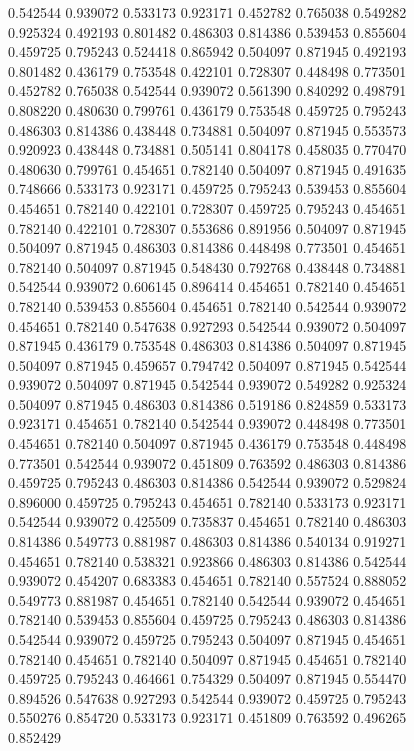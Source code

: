 \begin{figure}
\begin{center}
{  0.542544 0.939072
  0.533173 0.923171
  0.452782 0.765038
  0.549282 0.925324
  0.492193 0.801482
  0.486303 0.814386
  0.539453 0.855604
  0.459725 0.795243
  0.524418 0.865942
  0.504097 0.871945
  0.492193 0.801482
  0.436179 0.753548
  0.422101 0.728307
  0.448498 0.773501
  0.452782 0.765038
  0.542544 0.939072
  0.561390 0.840292
  0.498791 0.808220
  0.480630 0.799761
  0.436179 0.753548
  0.459725 0.795243
  0.486303 0.814386
  0.438448 0.734881
  0.504097 0.871945
  0.553573 0.920923
  0.438448 0.734881
  0.505141 0.804178
  0.458035 0.770470
  0.480630 0.799761
  0.454651 0.782140
  0.504097 0.871945
  0.491635 0.748666
  0.533173 0.923171
  0.459725 0.795243
  0.539453 0.855604
  0.454651 0.782140
  0.422101 0.728307
  0.459725 0.795243
  0.454651 0.782140
  0.422101 0.728307
  0.553686 0.891956
  0.504097 0.871945
  0.504097 0.871945
  0.486303 0.814386
  0.448498 0.773501
  0.454651 0.782140
  0.504097 0.871945
  0.548430 0.792768
  0.438448 0.734881
  0.542544 0.939072
  0.606145 0.896414
  0.454651 0.782140
  0.454651 0.782140
  0.539453 0.855604
  0.454651 0.782140
  0.542544 0.939072
  0.454651 0.782140
  0.547638 0.927293
  0.542544 0.939072
  0.504097 0.871945
  0.436179 0.753548
  0.486303 0.814386
  0.504097 0.871945
  0.504097 0.871945
  0.459657 0.794742
  0.504097 0.871945
  0.542544 0.939072
  0.504097 0.871945
  0.542544 0.939072
  0.549282 0.925324
  0.504097 0.871945
  0.486303 0.814386
  0.519186 0.824859
  0.533173 0.923171
  0.454651 0.782140
  0.542544 0.939072
  0.448498 0.773501
  0.454651 0.782140
  0.504097 0.871945
  0.436179 0.753548
  0.448498 0.773501
  0.542544 0.939072
  0.451809 0.763592
  0.486303 0.814386
  0.459725 0.795243
  0.486303 0.814386
  0.542544 0.939072
  0.529824 0.896000
  0.459725 0.795243
  0.454651 0.782140
  0.533173 0.923171
  0.542544 0.939072
  0.425509 0.735837
  0.454651 0.782140
  0.486303 0.814386
  0.549773 0.881987
  0.486303 0.814386
  0.540134 0.919271
  0.454651 0.782140
  0.538321 0.923866
  0.486303 0.814386
  0.542544 0.939072
  0.454207 0.683383
  0.454651 0.782140
  0.557524 0.888052
  0.549773 0.881987
  0.454651 0.782140
  0.542544 0.939072
  0.454651 0.782140
  0.539453 0.855604
  0.459725 0.795243
  0.486303 0.814386
  0.542544 0.939072
  0.459725 0.795243
  0.504097 0.871945
  0.454651 0.782140
  0.454651 0.782140
  0.504097 0.871945
  0.454651 0.782140
  0.459725 0.795243
  0.464661 0.754329
  0.504097 0.871945
  0.554470 0.894526
  0.547638 0.927293
  0.542544 0.939072
  0.459725 0.795243
  0.550276 0.854720
  0.533173 0.923171
  0.451809 0.763592
  0.496265 0.852429
}
\end{center}
\end{figure}
